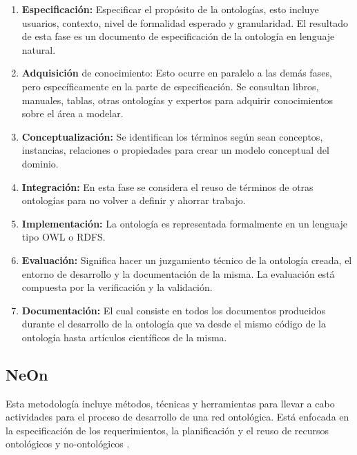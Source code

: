 \begin{enumerate}
\item \textbf{Especificación:} Especificar el propósito de la ontologías, esto incluye usuarios, contexto, nivel de formalidad esperado y granularidad. El resultado de esta fase es un documento de especificación de la ontología en lenguaje natural.
\item \textbf{Adquisición} de conocimiento: Esto ocurre en paralelo a las demás fases, pero específicamente en la parte de especificación. Se consultan libros, manuales, tablas, otras ontologías y expertos para adquirir conocimientos sobre el área a modelar.
\item \textbf{Conceptualización:} Se identifican los términos según sean conceptos, instancias, relaciones o propiedades para crear un modelo conceptual del dominio.
\item \textbf{Integración:} En esta fase se considera el reuso de términos de otras ontologías para no volver a definir y ahorrar trabajo.
\item \textbf{Implementación:} La ontología es representada formalmente en un lenguaje tipo OWL o RDFS.
\item \textbf{Evaluación:} Significa hacer un juzgamiento técnico de la ontología creada, el entorno de desarrollo y la documentación de la misma. La evaluación está compuesta por la verificación y la validación.
\item \textbf{Documentación:} El cual consiste en todos los documentos producidos durante el desarrollo de la ontología que va desde el mismo código de la ontología hasta artículos científicos de la misma.
\end{enumerate}


\subsection{NeOn}
Esta metodología incluye métodos, técnicas y herramientas para llevar a cabo actividades para el proceso de desarrollo de una red ontológica. Está enfocada en la especificación de los requerimientos, la planificación y el reuso de recursos ontológicos y no-ontológicos \cite{suarez2010neon}.

